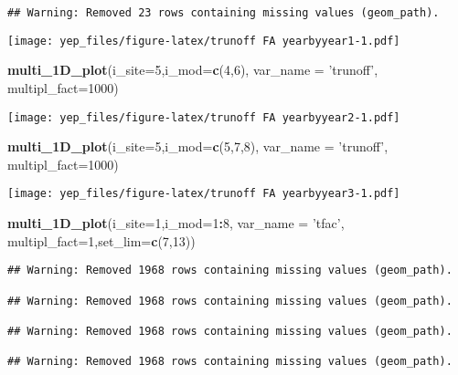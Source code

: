 \documentclass[]{article}
\newenvironment{Shaded}{\begin{snugshade}}{\end{snugshade}}
\newcommand{\DataTypeTok}[1]{\textcolor[rgb]{0.13,0.29,0.53}{#1}}
\newcommand{\DecValTok}[1]{\textcolor[rgb]{0.00,0.00,0.81}{#1}}
\newcommand{\KeywordTok}[1]{\textcolor[rgb]{0.13,0.29,0.53}{\textbf{#1}}}
\newcommand{\NormalTok}[1]{#1}
\newcommand{\OperatorTok}[1]{\textcolor[rgb]{0.81,0.36,0.00}{\textbf{#1}}}
\newcommand{\StringTok}[1]{\textcolor[rgb]{0.31,0.60,0.02}{#1}}
\begin{document}
\begin{verbatim}
## Warning: Removed 23 rows containing missing values (geom_path).
\end{verbatim}

\texttt{[image: yep\_files/figure-latex/trunoff FA yearbyyear1-1.pdf]}

\begin{Shaded}
\begin{Highlighting}[]
\KeywordTok{multi_1D_plot}\NormalTok{(}\DataTypeTok{i_site=}\DecValTok{5}\NormalTok{,}\DataTypeTok{i_mod=}\KeywordTok{c}\NormalTok{(}\DecValTok{4}\NormalTok{,}\DecValTok{6}\NormalTok{), }\DataTypeTok{var_name =} \StringTok{'trunoff'}\NormalTok{,  }\DataTypeTok{multipl_fact=}\DecValTok{1000}\NormalTok{)  }
\end{Highlighting}
\end{Shaded}

\texttt{[image: yep\_files/figure-latex/trunoff FA yearbyyear2-1.pdf]}

\begin{Shaded}
\begin{Highlighting}[]
\KeywordTok{multi_1D_plot}\NormalTok{(}\DataTypeTok{i_site=}\DecValTok{5}\NormalTok{,}\DataTypeTok{i_mod=}\KeywordTok{c}\NormalTok{(}\DecValTok{5}\NormalTok{,}\DecValTok{7}\NormalTok{,}\DecValTok{8}\NormalTok{), }\DataTypeTok{var_name =} \StringTok{'trunoff'}\NormalTok{,  }\DataTypeTok{multipl_fact=}\DecValTok{1000}\NormalTok{)  }
\end{Highlighting}
\end{Shaded}

\texttt{[image: yep\_files/figure-latex/trunoff FA yearbyyear3-1.pdf]}

\begin{Shaded}
\begin{Highlighting}[]
\KeywordTok{multi_1D_plot}\NormalTok{(}\DataTypeTok{i_site=}\DecValTok{1}\NormalTok{,}\DataTypeTok{i_mod=}\DecValTok{1}\OperatorTok{:}\DecValTok{8}\NormalTok{, }\DataTypeTok{var_name =} \StringTok{'tfac'}\NormalTok{,  }\DataTypeTok{multipl_fact=}\DecValTok{1}\NormalTok{,}\DataTypeTok{set_lim=}\KeywordTok{c}\NormalTok{(}\DecValTok{7}\NormalTok{,}\DecValTok{13}\NormalTok{))  }
\end{Highlighting}
\end{Shaded}

\begin{verbatim}
## Warning: Removed 1968 rows containing missing values (geom_path).

## Warning: Removed 1968 rows containing missing values (geom_path).

## Warning: Removed 1968 rows containing missing values (geom_path).

## Warning: Removed 1968 rows containing missing values (geom_path).
\end{verbatim}
\end{document}
